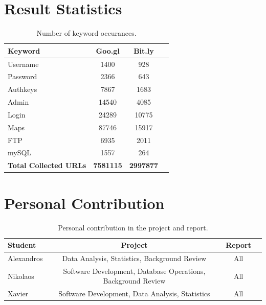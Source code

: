 \documentclass[12pt]{article}
\begin{document}
\begin{appendices}

\section{Result Statistics}

\begin{table}[h]
		\begin{tabular}{|l|c|c|c|}
			\hline
	  		\textbf{Keyword} & \textbf{Goo.gl} & \textbf{Bit.ly} \\
	  		\hline
  			Username & 1400 & 928 \\ 
  			\hline
  			Password & 2366 & 643 \\
	  		\hline
  			Authkeys & 7867 & 1683 \\
  			\hline
  			Admin & 14540 & 4085 \\
  			\hline
  			Login & 24289 & 10775 \\
  			\hline
  			Maps & 87746 & 15917 \\
  			\hline
  			FTP & 6935 & 2011 \\
  			\hline
  			mySQL & 1557 & 264 \\
  			\hline
			\textbf{Total Collected URLs} & \textbf{7581115} & \textbf{2997877} \\
			\hline
   		\end{tabular}
	\caption[A table]{Number of keyword occurances.}
\end{table}
\newpage
\section{Personal Contribution} 

\begin{table}[hc]
		\begin{tabular}{|l|c|c|c|}
  			\hline
	  		\textbf{Student} & \textbf{Project} & \textbf{Report} \\
	  		\hline
  			Alexandros & Data Analysis, Statistics, Background Review & All \\ 
  			\hline
  			Nikolaos & Software Development, Database Operations, Background Review & All \\
	  		\hline
  			Xavier & Software Development, Data Analysis, Statistics & All \\
  			\hline
  		\end{tabular}
	\caption[A table]{Personal contribution in the project and report.}	
\end{table}


\end{appendices}
\end{document}
